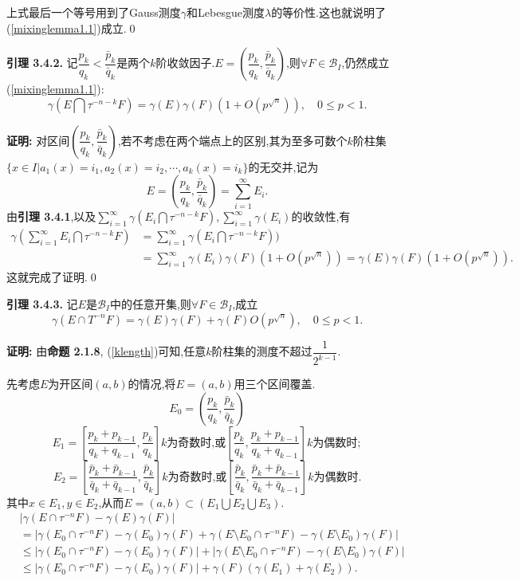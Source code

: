 上式最后一个等号用到了Gauss测度$\gamma$和Lebesgue测度$\lambda$的等价性.这也就说明了(\ref{mixinglemma1.1})成立.\qed
\par
\textbf{引理 3.4.2. }\textsuperscript{\cite{Liu_Peng,Mixing_lemma}}
记$\dfrac{p_k}{q_k}<\dfrac{\bar p_k}{\bar q_k}$是两个$k$阶收敛因子.$E=\left(\dfrac{p_k}{q_k},\dfrac{\bar p_k}{\bar q_k}\right)$,则$\forall F\in\mathcal{B}_I$,仍然成立(\ref{mixinglemma1.1}):
$$\gamma(E\bigcap \tau^{-n-k}F)=\gamma(E)\gamma(F)(1+O(p^{\sqrt{n}})),\quad 0\leqslant p<1.$$
\par\textbf{证明:  }
对区间$\left(\dfrac{p_k}{q_k},\dfrac{\bar p_k}{\bar q_k}\right)$,若不考虑在两个端点上的区别,其为至多可数个$k$阶柱集$\{x\in I|a_1(x)=i_1,a_2(x)=i_2,\cdots,a_k(x)=i_k\}$的无交并,记为
$$E=\left(\dfrac{p_k}{q_k},\dfrac{\bar p_k}{\bar q_k}\right)=\sum\limits_{i=1}^{\infty}E_i.$$
由\textbf{引理 3.4.1},以及$\sum\limits_{i=1}^{\infty}\gamma(E_i\bigcap\tau^{-n-k}F),\sum\limits_{i=1}^{\infty}\gamma(E_i)$的收敛性,有
\begin{align*}
    \gamma(\sum\limits_{i=1}^{\infty}E_i\bigcap\tau^{-n-k}F)&=\sum\limits_{i=1}^{\infty}\gamma(E_i\bigcap\tau^{-n-k}F))\\
    &=\sum\limits_{i=1}^{\infty}\gamma(E_i)\gamma(F)(1+O(p^{\sqrt{n}}))=\gamma(E)\gamma(F)(1+O(p^{\sqrt{n}})).
\end{align*}
这就完成了证明.\qed
\par
\textbf{引理 3.4.3.}\textsuperscript{\cite{Liu_Peng,Mixing_lemma}}
记$E$是$\mathcal{B}_I$中的任意开集,则$\forall F\in\mathcal{B}_I$,成立
\begin{equation}\label{mixinglemma3.1}
\gamma(E\cap T^{-n}F)=\gamma(E)\gamma(F)+\gamma(F)O(p^{\sqrt{n}}),\quad 0\leqslant p<1.
\end{equation}
\par
\textbf{证明:  }
由\textbf{命题 2.1.8}, (\ref{klength})可知,任意$k$阶柱集的测度不超过$\dfrac{1}{2^{k-1}}$.\par
先考虑$E$为开区间$(a,b)$的情况,将$E=(a,b)$用三个区间覆盖.
$$E_0=\left(\dfrac{p_k}{q_k},\dfrac{\bar p_k}{\bar q_k}\right)$$
$$E_1=\left[\dfrac{p_k+p_{k-1}}{q_k+q_{k-1}},\dfrac{p_k}{q_k}\right]k\text{为奇数时,或}\left[\dfrac{p_k}{q_k},\dfrac{p_k+p_{k-1}}{q_k+q_{k-1}}\right]k\text{为偶数时};$$
$$E_2=\left[\dfrac{\bar p_k+\bar p_{k-1}}{\bar q_k+\bar q_{k-1}},\dfrac{\bar p_k}{\bar q_k}\right]k\text{为奇数时,或}\left[\dfrac{\bar p_k}{\bar q_k},\dfrac{\bar p_k+\bar p_{k-1}}{\bar q_k+\bar q_{k-1}}\right]k\text{为偶数时}.$$
其中$x\in E_1,y\in E_2$,从而$E=(a,b)\subset(E_1\bigcup E_2\bigcup E_3)$.
\begin{align*}
&\left|\gamma(E\cap \tau^{-n}F)-\gamma(E)\gamma(F)\right|\\
&=\left|\gamma(E_0\cap \tau^{-n}F)-\gamma(E_0)\gamma(F)+\gamma(E\setminus E_0 \cap \tau^{-n}F)-\gamma(E\setminus E_0)\gamma(F)\right|\\
&\leqslant\left|\gamma(E_0\cap \tau^{-n}F)-\gamma(E_0)\gamma(F)\right|+\left|\gamma(E\setminus E_0 \cap \tau^{-n}F)-\gamma(E\setminus E_0)\gamma(F)\right|\\
&\leqslant\left|\gamma(E_0\cap \tau^{-n}F)-\gamma(E_0)\gamma(F)\right|+\gamma(F)(\gamma(E_1)+\gamma(E_2)).
\end{align*}
